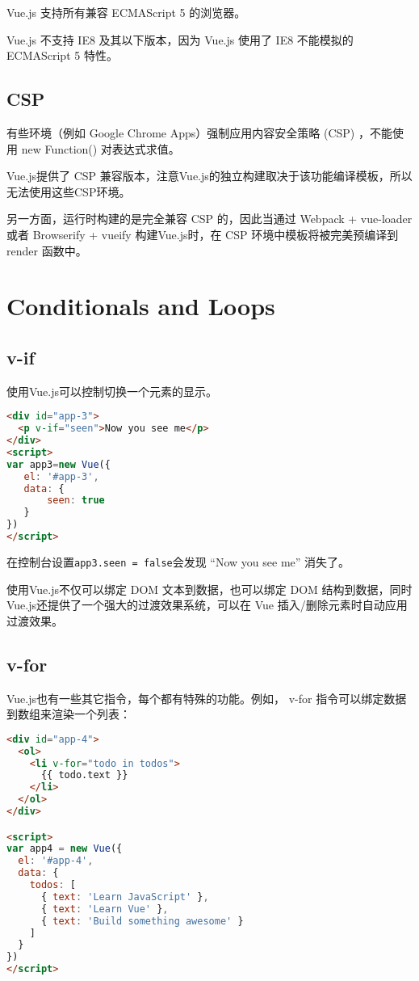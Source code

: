  Vue.js 支持所有兼容 ECMAScript 5 的浏览器。
 
 Vue.js 不支持 IE8 及其以下版本，因为 Vue.js 使用了 IE8 不能模拟的 ECMAScript 5 特性。
 
 \subsection{CSP}
 
 
 有些环境（例如 Google Chrome Apps）强制应用内容安全策略 (CSP) ，不能使用 new Function() 对表达式求值。
 
Vue.js提供了 CSP 兼容版本，注意Vue.js的独立构建取决于该功能编译模板，所以无法使用这些CSP环境。

另一方面，运行时构建的是完全兼容 CSP 的，因此当通过 Webpack + vue-loader 或者 Browserify + vueify 构建Vue.js时，在 CSP 环境中模板将被完美预编译到 render 函数中。


 


\section{Conditionals and Loops}

\subsection{v-if}



使用Vue.js可以控制切换一个元素的显示。


\begin{lstlisting}[language=HTML]
<div id="app-3">
  <p v-if="seen">Now you see me</p>
</div>
<script>
var app3=new Vue({
   el: '#app-3',
   data: {
       seen: true
   }
})
</script>
\end{lstlisting}

在控制台设置\texttt{app3.seen = false}会发现 “Now you see me” 消失了。


使用Vue.js不仅可以绑定 DOM 文本到数据，也可以绑定 DOM 结构到数据，同时Vue.js还提供了一个强大的过渡效果系统，可以在 Vue 插入/删除元素时自动应用过渡效果。

\subsection{v-for}

Vue.js也有一些其它指令，每个都有特殊的功能。例如， v-for 指令可以绑定数据到数组来渲染一个列表：

\begin{lstlisting}[language=HTML]
<div id="app-4">
  <ol>
    <li v-for="todo in todos">
      {{ todo.text }}
    </li>
  </ol>
</div>

<script>
var app4 = new Vue({
  el: '#app-4',
  data: {
    todos: [
      { text: 'Learn JavaScript' },
      { text: 'Learn Vue' },
      { text: 'Build something awesome' }
    ]
  }
})
</script>
\end{lstlisting}

